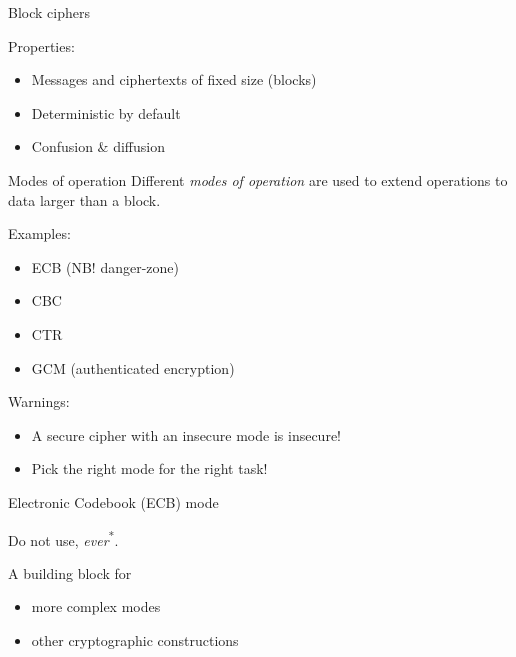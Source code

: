 \begin{frame}{Block ciphers}
\begin{center}
  \end{center}

  \pause
  Properties:
  \begin{itemize}[<+->]
    \item Messages and ciphertexts of fixed size (blocks)
    \item Deterministic by default
    \item Confusion \& diffusion
  \end{itemize}
\end{frame}

\begin{frame}{Modes of operation}
  Different \emph{modes of operation} are used to extend operations to data larger than a block.

  \pause
  Examples:
  \begin{itemize}[<+->]
    \item ECB (NB! danger-zone)
    \item CBC
    \item CTR
    \item GCM (authenticated encryption)
  \end{itemize}

  \pause
  Warnings:
  \begin{itemize}[<+->]
    \item A secure cipher with an insecure mode is insecure!
    \item Pick the right mode for the right task!
  \end{itemize}  
\end{frame}

\begin{frame}{Electronic Codebook (ECB) mode}
  \begin{center}
  \end{center}

  \pause
  Do not use, \emph{ever}\textsuperscript{*}.

  \pause
  A building block for
  \begin{itemize}[<+->]
    \item more complex modes
    \item other cryptographic constructions
  \end{itemize}
\end{frame}

